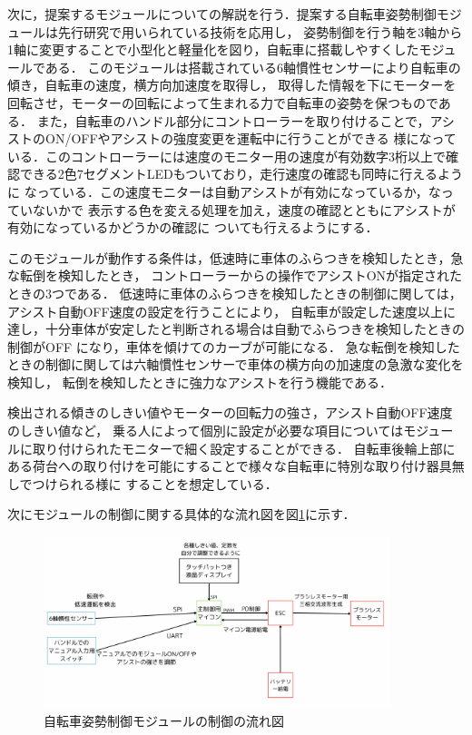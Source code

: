 \documentclass[uplatex,dvipdfmx]{jsarticle}
\begin{document}
次に，提案するモジュールについての解説を行う．提案する自転車姿勢制御モジュールは先行研究で用いられている技術を応用し，
姿勢制御を行う軸を3軸から1軸に変更することで小型化と軽量化を図り，自転車に搭載しやすくしたモジュールである．
このモジュールは搭載されている6軸慣性センサーにより自転車の傾き，自転車の速度，横方向加速度を取得し，
取得した情報を下にモーターを回転させ，モーターの回転によって生まれる力で自転車の姿勢を保つものである．
また，自転車のハンドル部分にコントローラーを取り付けることで，アシストのON/OFFやアシストの強度変更を運転中に行うことができる
様になっている．このコントローラーには速度のモニター用の速度が有効数字3桁以上で確認できる2色7セグメントLEDもついており，走行速度の確認も同時に行えるように
なっている．この速度モニターは自動アシストが有効になっているか，なっていないかで
表示する色を変える処理を加え，速度の確認とともにアシストが有効になっているかどうかの確認に
ついても行えるようにする．

このモジュールが動作する条件は，低速時に車体のふらつきを検知したとき，急な転倒を検知したとき，
コントローラーからの操作でアシストONが指定されたときの3つである．
低速時に車体のふらつきを検知したときの制御に関しては，アシスト自動OFF速度の設定を行うことにより，
自転車が設定した速度以上に達し，十分車体が安定したと判断される場合は自動でふらつきを検知したときの制御がOFF
になり，車体を傾けてのカーブが可能になる．
急な転倒を検知したときの制御に関しては六軸慣性センサーで車体の横方向の加速度の急激な変化を検知し，
転倒を検知したときに強力なアシストを行う機能である．

検出される傾きのしきい値やモーターの回転力の強さ，アシスト自動OFF速度のしきい値など，
乗る人によって個別に設定が必要な項目についてはモジュールに取り付けられたモニターで細く設定することができる．
自転車後輪上部にある荷台への取り付けを可能にすることで様々な自転車に特別な取り付け器具無しでつけられる様に
することを想定している．

次にモジュールの制御に関する具体的な流れ図を図\ref{fig:nagare}に示す．
\begin{figure}[H]
    \centering
    \includegraphics[width=0.9\textwidth]{fig/nagare.png}
    \caption{自転車姿勢制御モジュールの制御の流れ図}
    \label{fig:nagare}
\end{figure}
\end{document}
